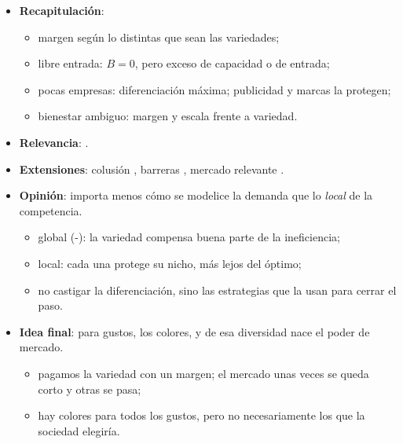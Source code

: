 \documentclass{article}
\begin{document}
\begin{columnas}
\begin{itemize}
\item \textbf{Recapitulación}:
  \begin{itemize}
  \item margen según lo distintas que sean las variedades;
  \item libre entrada: $B=0$, pero exceso de capacidad o de entrada;
  \item pocas empresas: diferenciación máxima; publicidad y marcas la protegen;
  \item bienestar ambiguo: margen y escala frente a variedad.
  \end{itemize}
\item \textbf{Relevancia}:     .
\item \textbf{Extensiones}: colusión , barreras , mercado relevante .
\item \textbf{Opinión}: importa menos cómo se modelice la demanda que lo \emph{local} de la competencia.
  \begin{itemize}
  \item global (-): la variedad compensa buena parte de la ineficiencia;
  \item local: cada una protege su nicho, más lejos del óptimo;
  \item no castigar la diferenciación, sino las estrategias que la usan para cerrar el paso.
  \end{itemize}
\item \textbf{Idea final}: para gustos, los colores, y de esa diversidad nace el poder de mercado.
  \begin{itemize}
  \item pagamos la variedad con un margen; el mercado unas veces se queda corto y otras se pasa;
  \item hay colores para todos los gustos, pero no necesariamente los que la sociedad elegiría.
  \end{itemize}
\end{itemize}


\end{columnas}
\end{document}
